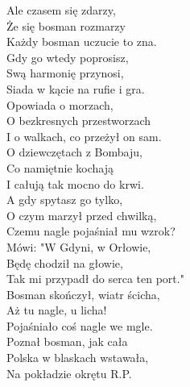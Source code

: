\begin{multicols}{2}
Ale czasem się zdarzy, \\
Że się bosman rozmarzy  \\
Każdy bosman uczucie to zna. \\
Gdy go wtedy poprosisz, \\
Swą harmonię przynosi, \\
Siada w kącie na rufie i gra. \\

Opowiada o morzach, \\
O bezkresnych przestworzach \\
I o walkach, co przeżył on sam. \\
O dziewczętach z Bombaju, \\
Co namiętnie kochają \\
I całują tak mocno do krwi. \\

A gdy spytasz go tylko, \\
O czym marzył przed chwilką, \\
Czemu nagle pojaśniał mu wzrok? \\
Mówi: "W Gdyni, w Orłowie, \\
Będę chodził na głowie, \\
Tak mi przypadł do serca ten port." \\

Bosman skończył, wiatr ścicha, \\
Aż tu nagle, u licha! \\
Pojaśniało coś nagle we mgle. \\
Poznał bosman, jak cała \\
Polska w blaskach wstawała, \\
Na pokładzie okrętu R.P.
\end{multicols}